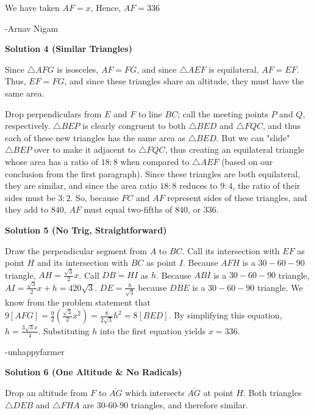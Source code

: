 \begin{enumerate}
 We have taken $AF = x$, Hence, $AF = \boxed{336}$

 -Arnav Nigam

 



\textbf{Solution 4 (Similar Triangles)}

Since $\triangle AFG$ is isosceles, $AF = FG$, and since $\triangle AEF$ is equilateral, $AF = EF$. Thus, $EF = FG$, and since these triangles share an altitude, they must have the same area.

 Drop perpendiculars from $E$ and $F$ to line $BC$; call the meeting points $P$ and $Q$, respectively. $\triangle BEP$ is clearly congruent to both $\triangle BED$ and $\triangle FQC$, and thus each of these new triangles has the same area as $\triangle BED$. But we can "slide" $\triangle BEP$ over to make it adjacent to $\triangle FQC$, thus creating an equilateral triangle whose area has a ratio of $18:8$ when compared to $\triangle AEF$ (based on our conclusion from the first paragraph). Since these triangles are both equilateral, they are similar, and since the area ratio $18:8$ reduces to $9:4$, the ratio of their sides must be $3:2$. So, because $FC$ and $AF$ represent sides of these triangles, and they add to $840$, $AF$ must equal two-fifths of $840$, or $\boxed{336}$.

 



\textbf{Solution 5 (No Trig, Straightforward)}

Draw the perpendicular segment from $A$ to $BC$. Call its intersection with $EF$ as point $H$ and its intersection with $BC$ as point $I$. Because $AFH$ is a $30-60-90$ triangle, $AH = \frac{\sqrt{3}}{2}x$. Call $DB = HI$ as $h$. Because $ABI$ is a $30-60-90$ triangle, $AI = \frac{\sqrt{3}}{2}x + h = 420\sqrt{3}$. $DE = \frac{h}{\sqrt{3}}$ because $DBE$ is a $30-60-90$ triangle. We know from the problem statement that $9[AFG]= \frac{9}{2}(\frac{\sqrt{3}}{2}x^2) = \frac{8}{2\sqrt{3}}h^2 = 8[BED]$. By simplifying this equation, $h = \frac{3\sqrt{3}x}{4}$. Substituting $h$ into the first equation yields $x = \boxed{336}$.

 -unhappyfarmer

 



\textbf{Solution 6 (One Altitude & No Radicals)}

Drop an altitude from $F$ to $\overline{AG}$ which intersects $\overline{AG}$ at point $H$. Both triangles $\triangle DEB$ and $\triangle FHA$ are $30$-$60$-$90$ triangles, and therefore similar.


\end{enumerate}
